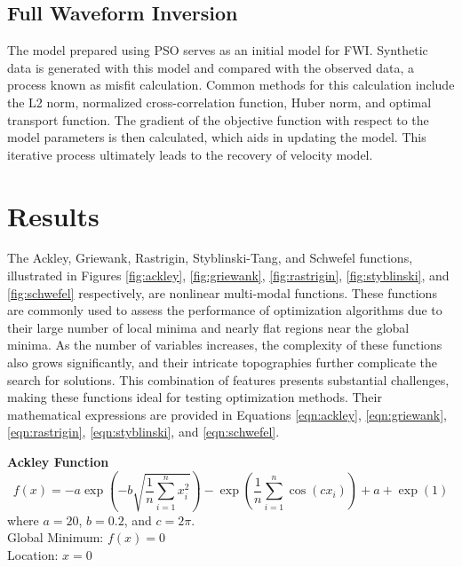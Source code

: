 \documentclass[paper,revised]{geophysics}
\begin{document}
\subsection{Full Waveform Inversion}
The model prepared using PSO serves as an initial model for FWI. Synthetic data is generated with this model and compared with the observed data, a process known as misfit calculation. Common methods for this calculation include the L2 norm, normalized cross-correlation function, Huber norm, and optimal transport function. The gradient of the objective function with respect to the model parameters is then calculated, which aids in updating the model. This iterative process ultimately leads to the recovery of velocity model.
\label{method}

\section{Results}

\begin{acknowledgments}

\end{acknowledgments}

 \label{appendix_1}
The Ackley, Griewank, Rastrigin, Styblinski-Tang, and Schwefel functions, illustrated in Figures \ref{fig:ackley}, \ref{fig:griewank}, \ref{fig:rastrigin}, \ref{fig:styblinski}, and \ref{fig:schwefel} respectively, are nonlinear multi-modal functions. These functions are commonly used to assess the performance of optimization algorithms due to their large number of local minima and nearly flat regions near the global minima. As the number of variables increases, the complexity of these functions also grows significantly, and their intricate topographies further complicate the search for solutions. This combination of features presents substantial challenges, making these functions ideal for testing optimization methods.
Their mathematical expressions are provided in Equations \ref{eqn:ackley}, \ref{eqn:griewank}, \ref{eqn:rastrigin}, \ref{eqn:styblinski}, and \ref{eqn:schwefel}.

{\bf{Ackley Function}}
\begin{equation}
	f(x) = -a \exp\left(-b \sqrt{\frac{1}{n} \sum_{i=1}^{n} x_i^2}\right) - \exp\left(\frac{1}{n} \sum_{i=1}^{n} \cos(c x_i)\right) + a + \exp(1)
\end{equation}
where \( a = 20 \), \( b = 0.2 \), and \( c = 2\pi \).\\
Global Minimum: \(f(x)=0\)\\
Location: \(x=0\)
\end{document}

